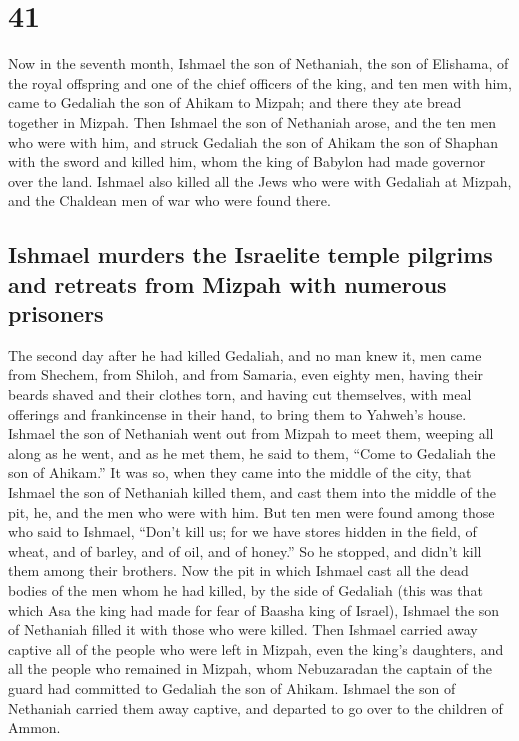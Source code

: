 \hypertarget{section-40}{%
\section{41}\label{section-40}}

 Now in the seventh month, Ishmael the son of Nethaniah,
the son of Elishama, of the royal offspring and one of the chief
officers of the king, and ten men with him, came to Gedaliah the son of
Ahikam to Mizpah; and there they ate bread together in Mizpah.
 Then Ishmael the son of Nethaniah arose, and the ten men
who were with him, and struck Gedaliah the son of Ahikam the son of
Shaphan with the sword and killed him, whom the king of Babylon had made
governor over the land.  Ishmael also killed all the Jews
who were with Gedaliah at Mizpah, and the Chaldean men of war who were
found there.

\hypertarget{ishmael-murders-the-israelite-temple-pilgrims-and-retreats-from-mizpah-with-numerous-prisoners}{%
\subsection{Ishmael murders the Israelite temple pilgrims and retreats
from Mizpah with numerous
prisoners}\label{ishmael-murders-the-israelite-temple-pilgrims-and-retreats-from-mizpah-with-numerous-prisoners}}

 The second day after he had killed Gedaliah, and no man
knew it,  men came from Shechem, from Shiloh, and from
Samaria, even eighty men, having their beards shaved and their clothes
torn, and having cut themselves, with meal offerings and frankincense in
their hand, to bring them to Yahweh's house.  Ishmael the
son of Nethaniah went out from Mizpah to meet them, weeping all along as
he went, and as he met them, he said to them, ``Come to Gedaliah the son
of Ahikam.''  It was so, when they came into the middle of
the city, that Ishmael the son of Nethaniah killed them, and cast them
into the middle of the pit, he, and the men who were with him.
 But ten men were found among those who said to Ishmael,
``Don't kill us; for we have stores hidden in the field, of wheat, and
of barley, and of oil, and of honey.'' So he stopped, and didn't kill
them among their brothers.  Now the pit in which Ishmael
cast all the dead bodies of the men whom he had killed, by the side of
Gedaliah (this was that which Asa the king had made for fear of Baasha
king of Israel), Ishmael the son of Nethaniah filled it with those who
were killed.  Then Ishmael carried away captive all of
the people who were left in Mizpah, even the king's daughters, and all
the people who remained in Mizpah, whom Nebuzaradan the captain of the
guard had committed to Gedaliah the son of Ahikam. Ishmael the son of
Nethaniah carried them away captive, and departed to go over to the
children of Ammon.

